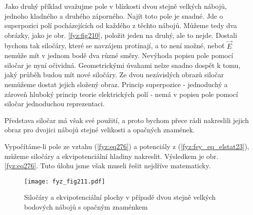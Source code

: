 {    Jako druhý příklad uvažujme pole v blízkosti dvou stejně velkých nábojů, jednoho kladného a 
    druhého záporného. Najít toto pole je snadné. Jde o superpozici polí pocházejících od každého z 
    těchto nábojů. Můžeme tedy dva obrázky, jako je obr. \ref{fyz:fig210}, položit jeden 
    na druhý, ale to nejde. Dostali bychom tak siločáry, které se navzájem protínají, a to není 
    možné, neboť \(\vec{E}\) nemůže mít v jednom bodě dva různé směry. Nevýhoda popisu pole pomocí 
    siločar je nyní očividná. Geometrickými úvahami nelze snadno dospět k tomu, jaký průběh budou 
    mít nové siločáry. Ze dvou nezávislých obrazů siločar nemůžeme dostat jejich složený obraz. 
    Princip superpozice - jednoduchý a zároveň hluboký princip teorie elektrických polí - nemá v 
    popisu pole pomocí siločar jednoduchou reprezentaci.
    
    Představa siločar má však své použití, a proto bychom přece rádi nakreslili jejich obraz pro 
    dvojici nábojů stejné velikosti a opačných znamének.
    
    Vypočítáme-li pole ze vztahu (\ref{fyz:eq276}) a potenciály z 
    (\ref{fyz:fey_eq_elstat23}), můžeme siločáry a ekvipotenciální hladiny nakreslit. Výsledkem je 
    obr. \ref{fyz:eq276}. Tuto úlohu jsme však museli řešit nejdříve matematicky.
    \begin{figure}[ht!]
     \centering
     \texttt{[image: fyz\_fig211.pdf]}
     \caption[Siločáry a ekvipotenciální plochy]{Siločáry a ekvipotenciální plochy v případě dvou 
              stejně velkých bodových nábojů s opačným znaménkem}
     \label{fyz:fig211}
    \end{figure}


} %
\printbibliography[title={Seznam literatury}, heading=subbibliography]
